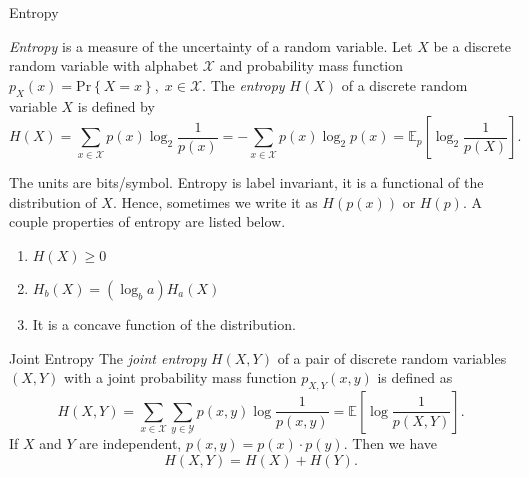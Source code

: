 


\begin{defn}{Entropy}{}

  \textit{Entropy} is a measure of the uncertainty of a random variable. Let \(X\) be a discrete random variable with alphabet \(\mathcal{X} \) and probability mass function \(p_{X} (x) = \mathrm{Pr} \left\{ X = x \right\}, \; x \in \mathcal{X}  \). The \textit{entropy} \(H(X)\) of a discrete random variable \(X\) is defined by 
\[
  H(X) =  \sum_{x \in \mathcal{X} } p(x) \log _2 \frac{1}{p(x)} = - \sum_{x \in \mathcal{X} } p(x) \log _2 p(x) = \mathbb{E}_{p}  \left[ \log _2 \frac{1}{p(X)} \right] .
\]

The units are bits/symbol. Entropy is label invariant, it is a functional of the distribution of \(X\). Hence, sometimes we write it as \(H(p(x))\) or \(H(p)\). A couple properties of entropy are listed below.

\begin{enumerate}
  \item \(H(X) \geq 0\) 
  \item \(H_{b} (X) = (\log _{b} a)H_{a} (X)\) 
  \item It is a concave function of the distribution.
\end{enumerate}
\end{defn}


% 
% 


\begin{defn}{Joint Entropy}{}
  The \textit{joint entropy } \(H(X,Y) \) of a pair of discrete random variables \((X,Y) \) with a joint probability mass function \(p_{X,Y}(x,y) \) is defined as 
\[
  H(X,Y) = \sum_{x \in \mathcal{X} } \sum_{y\in \mathcal{Y} } p(x,y)\log \frac{1}{p(x,y)} = \mathbb{E} \left[ \log \frac{1}{p(X,Y)} \right] . 
\]
If \(X\) and \(Y\) are independent, \(p(x,y) = p(x)\cdot p(y)\). Then we have
\[
  H(X,Y) = H(X) + H(Y). 
\]

% 
\end{defn}

